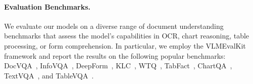 \paragraph{Evaluation Benchmarks.} We evaluate our models on a diverse range of document understanding benchmarks that assess the model's capabilities in OCR, chart reasoning, table processing, or form comprehension. In particular, we employ the VLMEvalKit~\citep{duan2024vlmevalkit} framework and report the results on the following popular benchmarks:  DocVQA~\citep{docvqa}, InfoVQA~\citep{mathew2021infographicvqa}, DeepForm~\citep{svetlichnaya2020deepform}, KLC~\citep{stanislawek2021kleister}, WTQ~\citep{pasupat2015compositional}, TabFact~\citep{Chen2020TabFact}, ChartQA~\citep{masry2022chartqa}, TextVQA~\citep{singh2019towards}, %
and TableVQA~\citep{kim2024tablevqa}.
